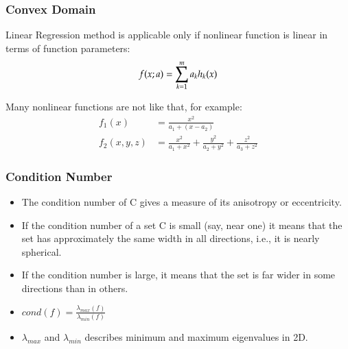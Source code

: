 
\begin{frame}
  \frametitle{Convex Domain}
Linear Regression method is applicable only if nonlinear function is
linear in terms of function parameters:
$$\displaystyle f(x; a) = \sum_{k=1}^m a_kh_k(x)$$

Many nonlinear functions are not like that, for example:
\begin{equation*}
  \begin{split}
f_1(x) & = \frac{x^2}{a_1 + (x - a_2)}\\
f_2(x, y, z) & = \frac{x^2}{a_1 + x^2} + \frac{y^2}{a_2 + y^2} + \frac{z^2}{a_3 + z^2}
  \end{split}
\end{equation*}
\end{frame}

\begin{frame}
\frametitle{Condition Number}
\begin{itemize}
\item The condition number of C gives a measure of its anisotropy or
  eccentricity.
\item If the condition number of a set C is small (say, near one) it
  means that the set has approximately the same width in all
  directions, i.e., it is nearly spherical.
\item If the condition number is large, it means that the set is far
  wider in some directions than in others.
\item $cond(f) = \frac{\lambda_{max}(f)}{\lambda_{min}(f)}$
\item $\lambda_{max}$ and $\lambda_{min}$ describes minimum and maximum eigenvalues in 2D.
\end{itemize}
\end{frame}

